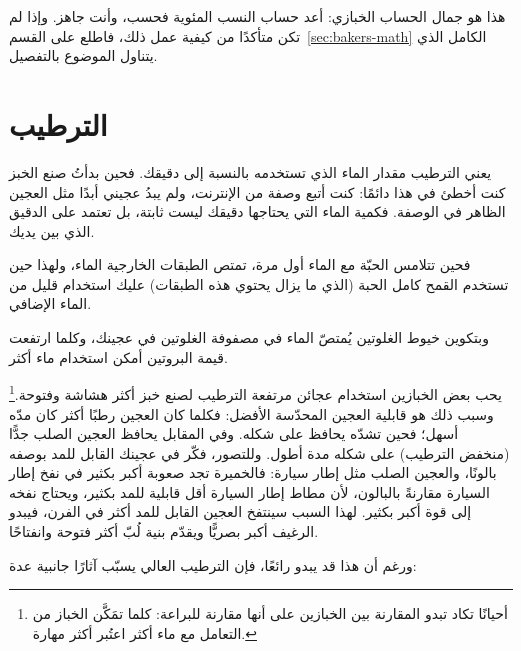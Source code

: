 هذا هو جمال الحساب الخبازي: أعد حساب النسب المئوية فحسب، وأنت جاهز. وإذا لم تكن متأكدًا من كيفية عمل ذلك، فاطلع على القسم~\ref{sec:bakers-math} الكامل الذي يتناول الموضوع بالتفصيل.

\section{الترطيب}

يعني الترطيب مقدار الماء الذي تستخدمه بالنسبة إلى دقيقك. فحين بدأتُ صنع الخبز كنت أخطئ في هذا دائمًا: كنت أتبع وصفة من الإنترنت، ولم يبدُ عجيني أبدًا مثل العجين الظاهر في الوصفة. فكمية الماء التي يحتاجها دقيقك ليست ثابتة، بل تعتمد على الدقيق الذي بين يديك.

فحين تتلامس الحبّة مع الماء أول مرة، تمتص الطبقات الخارجية الماء، ولهذا حين تستخدم القمح كامل الحبة (الذي ما يزال يحتوي هذه الطبقات) عليك استخدام قليل من الماء الإضافي.

وبتكوين خيوط الغلوتين يُمتصّ الماء في مصفوفة الغلوتين في عجينك، وكلما ارتفعت قيمة البروتين أمكن استخدام ماء أكثر.

يحب بعض الخبازين استخدام عجائن مرتفعة الترطيب لصنع خبز أكثر هشاشة وفتوحة.\footnote{أحيانًا تكاد تبدو المقارنة بين الخبازين على أنها مقارنة للبراعة: كلما تمَكَّن الخباز من التعامل مع ماء أكثر اعتُبر أكثر مهارة.} وسبب ذلك هو قابلية العجين المحدّسة الأفضل: فكلما كان العجين رطبًا أكثر كان مدّه أسهل؛ فحين تشدّه يحافظ على شكله. وفي المقابل يحافظ العجين الصلب جدًّا (منخفض الترطيب) على شكله مدة أطول. وللتصور، فكّر في عجينك القابل للمد بوصفه بالونًا، والعجين الصلب مثل إطار سيارة: فالخميرة تجد صعوبة أكبر بكثير في نفخ إطار السيارة مقارنةً بالبالون، لأن مطاط إطار السيارة أقل قابلية للمد بكثير، ويحتاج نفخه إلى قوة أكبر بكثير. لهذا السبب سينتفخ العجين القابل للمد أكثر في الفرن، فيبدو الرغيف أكبر بصريًّا ويقدّم بنية لُبّ أكثر فتوحة وانفتاحًا.

ورغم أن هذا قد يبدو رائعًا، فإن الترطيب العالي يسبّب آثارًا جانبية عدة:

